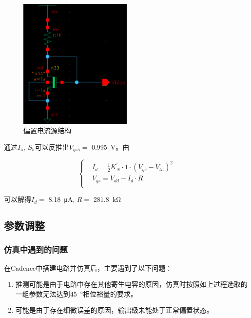 \documentclass[UTF8]{ctexart}
\numberwithin{figure}{subsection}
\numberwithin{table}{subsection}
\numberwithin{equation}{subsection}
\begin{document}
\begin{figure}[!ht]
    \begin{center}
        \includegraphics[width=0.5\textwidth]{Vbias.png}
    \end{center}
    \caption{偏置电流源结构}
    \label{current source circuit}
\end{figure}

通过\(I_5,\ S_5\)可以反推出$V_{gs5} = $ \SI[]{0.995}{\volt}。由

\begin{equation}
\left\{
\begin{aligned}
    & I_d = \frac{1}{2}K^{'}_{N}\cdot 1 \cdot \left(V_{gs} - V_{th}\right)^2 \\
    & V_{gs} = V_{dd} - I_d \cdot R\\
\end{aligned}
\right.
\end{equation}

可以解得\(I_d = \) \SI[]{8.18}{\micro\ampere}, \(R = \) \SI[]{281.8}{\kilo\ohm}

\subsection{参数调整}

\subsubsection{仿真中遇到的问题}
在Cadence中搭建电路并仿真后，主要遇到了以下问题：
\begin{enumerate}
    \item 推测可能是由于电路中存在其他寄生电容的原因，仿真时按照如上过程选取的一组参数无法达到\SI[]{45}{\degree}相位裕量的要求。
    \item 可能是由于存在细微误差的原因，输出级未能处于正常偏置状态。
\end{enumerate}
\end{document}
